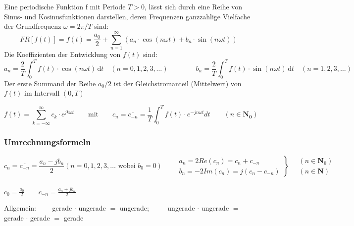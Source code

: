 		Eine periodische Funktion f mit Periode $T>0$, lässt sich durch eine Reihe von
		Sinus- und Kosinusfunktionen darstellen, deren Frequenzen ganzzahlige 
		Vielfache der Grundfrequenz $\omega = 2\pi / T$ sind:
		$$ FR[f(t)] = f(t) =\frac{a_0}{2} + \sum_{n=1}^\infty (a_n \cdot \cos(n \omega t) + b_n
		\cdot \sin(n\omega t))$$
		Die Koeffizienten der Entwicklung von $f(t)$ sind:
		$$ a_n=\frac{2}{T}\int_{0}^{T} f(t) \cdot \cos(n\omega t)\, \mathrm{d}t \quad (n=0,1,2,3,\ldots)
		 \qquad \qquad b_n=\frac{2}{T}\int_{0}^{T} f(t) \cdot \sin(n\omega t)\,
		 \mathrm{d}t \quad (n=1,2,3,\ldots) $$ 
		Der erste Summand der Reihe $a_0/2$ ist der Gleichstromanteil (Mittelwert) von
		$f(t)$ im Intervall $(0,T)$

		$$f(t) = \sum\limits_{k = -\infty}^{\infty} c_k \cdot e^{j k \omega t} \qquad \text{mit} \qquad c_n=\overline{c_{-n}}=\frac{1}{T}\int_0^T{f(t)\cdot e^{-jn\omega t}dt} \qquad (n \in \mathbf{N_0})$$
		\subsubsection{Umrechnungsformeln}
			$$c_n=\overline{c_{-n}}=\frac{a_n-jb_n}{2} (n=0,1,2,3,\ldots\text{ wobei }b_0=0)\qquad
			\left.
			\begin{array}{l} 
				a_n=2Re(c_n) = c_n + c_{-n}\\
				b_n=-2Im(c_n) = j(c_n - c_{-n})
			\end{array}
		    \right\} 
		    \quad \begin{array}{l}
				(n \in \mathbf{N_0}) \\
				(n \in \mathbf{N})
			\end{array}$$ \\
		$c_0 = \frac{a_0}{2} \qquad c_{-n} = \frac{a_n + jb_n}{2}$

	  
		Allgemein:$\qquad$ gerade $\cdot$ ungerade $=$ ungerade; $\qquad$ ungerade $\cdot$ ungerade $=$ gerade $\cdot$ gerade $=$ gerade

